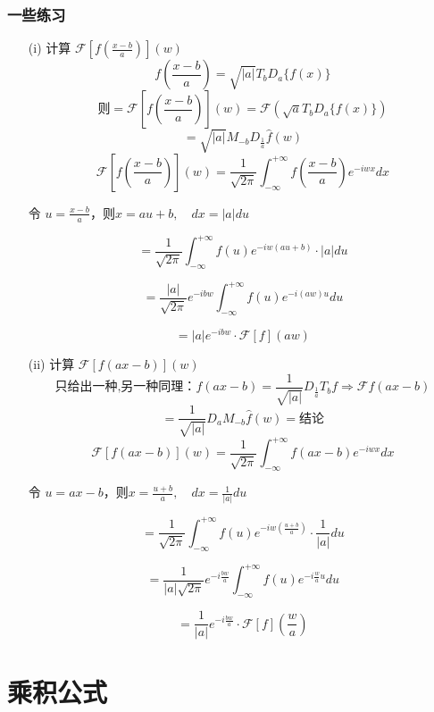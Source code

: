 \documentclass[linespread=1.5,openany]{book}%
\theoremstyle{plain}
\begin{document}
{{				\subsection{一些练习}
				
				\begin{itemize}
					\item[(i)]计算 $\mathcal{F}\left[ f\left( \frac{x-b}{a} \right) \right](w)$
					\[f(\frac{x-b}{a})=\sqrt{|a|}T_bD_a\{f(x)\}\]
					\[\text{则}=\mathcal{F}\left[ f\left( \frac{x-b}{a} \right) \right](w)=\mathcal{F}(\sqrt{a}T_bD_a\{f(x)\})\]\[=\sqrt{|a|}M_{-b}D_{\frac{1}{a}}\hat{f}(w)\]
					\[
					\mathcal{F}\left[ f\left( \frac{x-b}{a} \right) \right](w) = \frac{1}{\sqrt{2\pi}} \int_{-\infty}^{+\infty} f\left( \frac{x-b}{a} \right) e^{-iwx} dx
					\]
					
					令 $u = \frac{x-b}{a}$，则$x = au + b, \quad dx = |a|du$
					
					\[
					= \frac{1}{\sqrt{2\pi}} \int_{-\infty}^{+\infty} f(u) e^{-iw(au+b)} \cdot |a|du
					\]
					
					\[
					= \frac{|a|}{\sqrt{2\pi}} e^{-ibw} \int_{-\infty}^{+\infty} f(u) e^{-i(a w)u} du
					\]
					
					\[
					= |a| e^{-ibw} \cdot \mathcal{F}[f](aw)
					\]
					
					\item[(ii)]计算 $\mathcal{F}\left[ f(ax-b) \right](w)$
					\[\text{只给出一种,另一种同理：}f(ax-b)= \frac{1}{\sqrt{|a|}}D_{\frac{1}{a}}T_bf\Rightarrow\mathcal{F}f(ax-b)\]\[=\frac{1}{\sqrt{|a|}}D_aM_{-b}\hat{f}(w)=结论\]
					\[
					\mathcal{F}\left[ f(ax-b) \right](w) = \frac{1}{\sqrt{2\pi}} \int_{-\infty}^{+\infty} f(ax-b) e^{-iwx} dx
					\]
					
					令 $u = ax - b$，则$x = \frac{u + b}{a}, \quad dx = \frac{1}{|a|}du$
					
					\[
					= \frac{1}{\sqrt{2\pi}} \int_{-\infty}^{+\infty} f(u) e^{-iw\left(\frac{u+b}{a}\right)} \cdot \frac{1}{|a|}du
					\]
					
					\[
					= \frac{1}{|a|\sqrt{2\pi}} e^{-i\frac{bw}{a}} \int_{-\infty}^{+\infty} f(u) e^{-i\frac{w}{a}u} du
					\]
					
					\[
					= \frac{1}{|a|} e^{-i\frac{bw}{a}} \cdot \mathcal{F}[f]\left( \frac{w}{a} \right)
					\]
				\end{itemize}
			}
			\chapter{乘积公式}{
}}
\end{document}
